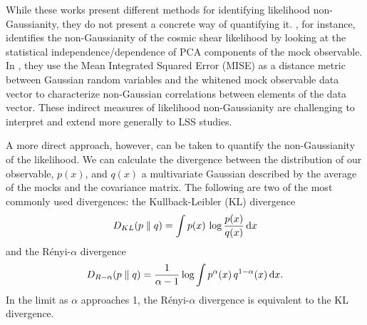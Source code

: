 \documentclass[12pt, letterpaper, preprint]{aastex}
\newcommand{\beq}{\begin{equation}}
\newcommand{\eeq}{\end{equation}}
\begin{document}
While these works present different methods for identifying 
likelihood non-Gaussianity, they do not present a concrete way of 
quantifying it. \cite{hartlap2009}, for instance, identifies the
non-Gaussianity of the cosmic shear likelihood by looking at the
statistical independence/dependence of PCA components of the mock 
observable. In \cite{sellentin2017}, they use the Mean
Integrated Squared Error (MISE) as a distance metric between 
Gaussian random variables and the whitened mock observable 
data vector to characterize non-Gaussian correlations between elements 
of the data vector. These indirect measures of likelihood non-Gaussianity 
are challenging to interpret and extend more generally to LSS studies. 

A more direct approach, however, can be taken to quantify the 
non-Gaussianity of the likelihood. We can calculate the divergence between 
the distribution of our observable, $p(x)$, and $q(x)$ a multivariate Gaussian described 
by the average of the mocks and the covariance matrix.
The following are two of the most commonly used divergences: 
the Kullback-Leibler (KL) divergence
\beq \label{eq:kl} 
D_{KL} ( p \parallel q ) = \int p(x)\,\log \frac{p(x)}{q(x)}\,{\rm d}x
\eeq
and the R\'enyi-$\alpha$ divergence
\beq \label{eq:renyi}
D_{R-\alpha} ( p \parallel q ) = \frac{1}{\alpha -1} \log \int p^\alpha(x)\, q^{1 -\alpha}(x)\,{\rm d}x. 
\eeq
In the limit as $\alpha$ approaches 1, the R\'enyi-$\alpha$ divergence is
equivalent to the KL divergence.
\end{document}
